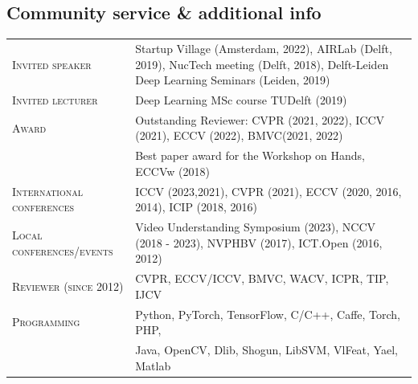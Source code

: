\documentclass[a4paper, oneside, final]{scrartcl}
\begin{document}
\begin{center}
		\section{Community service \& additional info}
        \begin{tabular}{p{4.5cm}@{\hskip 0.3in}p{11.3cm}}
            \textsc{Invited speaker}            & Startup Village (Amsterdam, 2022), AIRLab (Delft, 2019), NucTech meeting (Delft, 2018), Delft-Leiden Deep Learning Seminars (Leiden, 2019)\\
            \textsc{Invited lecturer}           & Deep Learning MSc course TUDelft (2019)\\
            \textsc{Award}                      & Outstanding Reviewer: CVPR (2021, 2022), ICCV (2021), ECCV (2022), BMVC(2021, 2022)\\ 
                                                & Best paper award for the Workshop on Hands, ECCVw (2018)\\  
            \textsc{International conferences}  & ICCV (2023,2021), CVPR (2021), ECCV (2020, 2016, 2014), ICIP (2018, 2016)\\
            \textsc{Local conferences\slash events} & Video Understanding Symposium (2023), NCCV (2018 - 2023), NVPHBV (2017), ICT.Open (2016, 2012)\\
            \textsc{Reviewer (since 2012)}      & CVPR, ECCV/ICCV, BMVC, WACV, ICPR, TIP, IJCV\\
			\textsc{Programming}                & Python, PyTorch, TensorFlow, C\slash C++, Caffe, Torch, PHP,\\ 
			                                    & Java, OpenCV, Dlib, Shogun, LibSVM, VlFeat, Yael, Matlab\\
		\end{tabular}
	\end{center}
\end{document}

